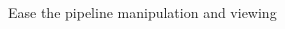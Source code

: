 \documentclass{beamer}
\begin{document}
\begin{frame}{Ease the pipeline manipulation and viewing}
\begin{columns}
\begin{column}{0.5\textwidth}

        \end{column}
        \begin{column}{0.5\textwidth}


\end{column}
\end{columns}
\end{frame}
\end{document}
